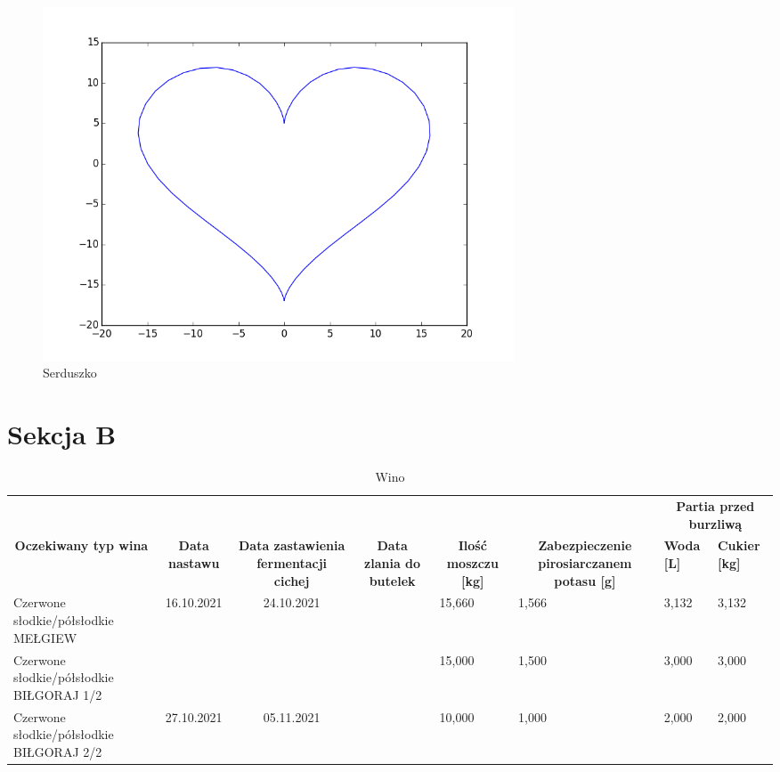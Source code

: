 \documentclass[a4paper,12pt]{book} %
\begin{document}
\begin{figure}[h]
	\centering
	\includegraphics[width=14cm]{figures/heart.png}
	\caption{Serduszko}
	\label{fig1}
\end{figure}


\section{Sekcja B}

\begin{table}[h]
	\centering
	\caption{Wino}
	\begin{tabular}{lcccllll}
		\multicolumn{1}{c}{{\color[HTML]{44546A} }} &
		{\color[HTML]{44546A} } &
		{\color[HTML]{44546A} } &
		{\color[HTML]{44546A} } &
		\multicolumn{1}{c}{{\color[HTML]{44546A} }} &
		\multicolumn{1}{c}{{\color[HTML]{44546A} }} &
		\multicolumn{2}{c}{{\color[HTML]{44546A} \textbf{Partia przed burzliwą}}} \\
		\multicolumn{1}{c}{\multirow{-2}{*}{{\color[HTML]{44546A} \textbf{Oczekiwany typ wina}}}} &
		\multirow{-2}{*}{{\color[HTML]{44546A} \textbf{Data nastawu}}} &
		\multirow{-2}{*}{{\color[HTML]{44546A} \textbf{Data zastawienia fermentacji cichej}}} &
		\multirow{-2}{*}{{\color[HTML]{44546A} \textbf{Data zlania do butelek}}} &
		\multicolumn{1}{c}{\multirow{-2}{*}{{\color[HTML]{44546A} \textbf{Ilość moszczu {[}kg{]}}}}} &
		\multicolumn{1}{c}{\multirow{-2}{*}{{\color[HTML]{44546A} \textbf{Zabezpieczenie   pirosiarczanem potasu {[}g{]}}}}} &
		{\color[HTML]{44546A} \textbf{Woda   {[}L{]}}} &
		{\color[HTML]{44546A} \textbf{Cukier {[}kg{]}}} \\
		Czerwone słodkie/półsłodkie MEŁGIEW &
		16.10.2021 &
		24.10.2021 &
		\multicolumn{1}{l}{} &
		15,660 &
		1,566 &
		3,132 &
		3,132 \\
		Czerwone słodkie/półsłodkie BIŁGORAJ 1/2 &
		&
		&
		&
		15,000 &
		1,500 &
		3,000 &
		3,000 \\
		Czerwone słodkie/półsłodkie BIŁGORAJ 2/2 &
		\multirow{-2}{*}{27.10.2021} &
		\multirow{-2}{*}{05.11.2021} &
		\multirow{-2}{*}{} &
		10,000 &
		1,000 &
		2,000 &
		2,000
	\end{tabular}
\end{table}
\end{document}
